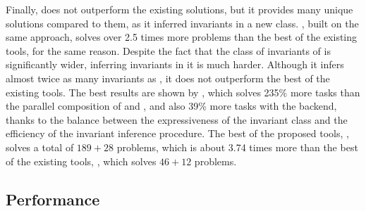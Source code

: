 Finally, \ringen{\cvc{}} does not outperform the existing solutions, but it provides many unique solutions compared to them, as it inferred invariants in a new class. \ringen{\vampire{}}, built on the same approach, solves over 2.5 times more problems than the best of the existing tools, for the same reason. Despite the fact that the class of invariants of \ringenSync{} is significantly wider, inferring invariants in it is much harder. Although it infers almost twice as many invariants as \ringen{\cvc{}}, it does not outperform the best of the existing tools. The best results are shown by \ringenCICI{\cvc{}}, which solves 235\% more tasks than the parallel composition of \racer{} and \ringen{\cvc{}}, and also 39\% more tasks with the \vampire{} backend, thanks to the balance between the expressiveness of the invariant class and the efficiency of the invariant inference procedure. The best of the proposed tools, \ringenCICI{\vampire{}}, solves a total of $189+28$ problems, which is about 3.74 times more than the best of the existing tools, \eldarica{}, which solves $46+12$ problems.

\subsection{Performance}\label{sec:evaluation/performance}

\toolplotOne{}

